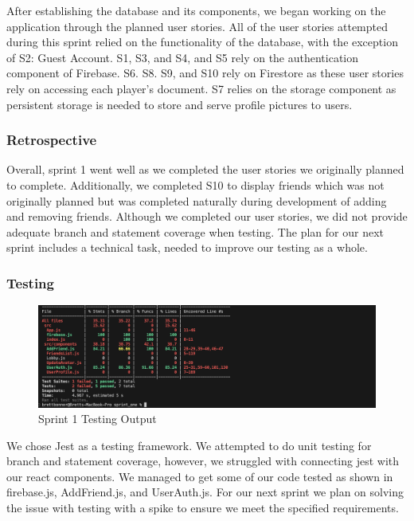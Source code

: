 After establishing the database and its components, we began working on the application through the planned user stories. All of the user stories attempted during this sprint relied on the functionality of the database, with the exception of S2: Guest Account. S1, S3, and S4, and S5 rely on the authentication component of Firebase. S6. S8. S9, and S10 rely on Firestore as these user stories rely on accessing each player's document. S7 relies on the storage component as persistent storage is needed to store and serve profile pictures to users. 

\subsubsection{Retrospective}

Overall, sprint 1 went well as we completed the user stories we originally planned to complete. Additionally, we completed S10 to display friends which was not originally planned but was completed naturally during development of adding and removing friends. Although we completed our user stories, we did not provide adequate branch and statement coverage when testing. The plan for our next sprint includes a technical task, needed to improve our testing as a whole.

\subsubsection {Testing}
\begin{figure}[h]
    \centering
    \includegraphics[width=1\linewidth]{figures/Testing-2.png}
    \caption{Sprint 1 Testing Output}
    \label{fig:enter-label}
\end{figure}

    We chose Jest as a testing framework. We attempted to do unit testing for branch and statement coverage, however, we struggled with connecting jest with our react components. We managed to get some of our code tested as shown in firebase.js, AddFriend.js, and UserAuth.js. For our next sprint we plan on solving the issue with testing with a spike to ensure we meet the specified requirements. 


